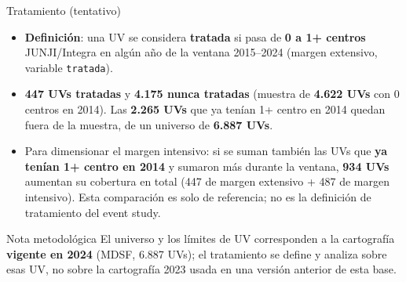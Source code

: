 \documentclass[aspectratio=169,10pt]{beamer}
\begin{document}
\begin{frame}{Tratamiento (tentativo)}
\begin{itemize}
  \item \textbf{Definición}: una UV se considera \textbf{tratada} si pasa de \textbf{0 a 1+ centros} JUNJI/Integra en algún año de la ventana 2015--2024 (margen extensivo, variable \texttt{tratada}).
  \item \textbf{447 UVs tratadas} y \textbf{4.175 nunca tratadas} (muestra de \textbf{4.622 UVs} con 0 centros en 2014). Las \textbf{2.265 UVs} que ya tenían 1+ centro en 2014 quedan fuera de la muestra, de un universo de \textbf{6.887 UVs}.
  \item Para dimensionar el margen intensivo: si se suman también las UVs que \textbf{ya tenían 1+ centro en 2014} y sumaron más durante la ventana, \textbf{934 UVs} aumentan su cobertura en total (447 de margen extensivo + 487 de margen intensivo). Esta comparación es solo de referencia; no es la definición de tratamiento del event study.
\end{itemize}

\vspace{10pt}
\begin{block}{Nota metodológica}
\footnotesize El universo y los límites de UV corresponden a la cartografía \textbf{vigente en 2024} (MDSF, 6.887 UVs); el tratamiento se define y analiza sobre esas UV, no sobre la cartografía 2023 usada en una versión anterior de esta base.
\end{block}
\end{frame}
\end{document}
